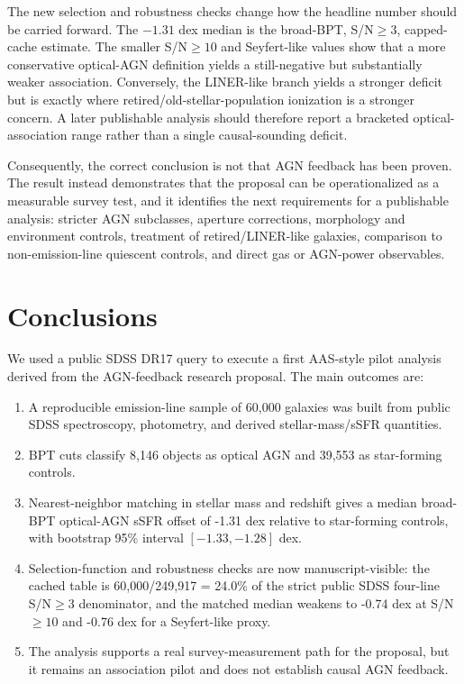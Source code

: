 \documentclass[twocolumn]{aastex631}
\begin{document}
The new selection and robustness checks change how the headline number should be carried forward.  The $-1.31$ dex median is the broad-BPT, S/N$\geq3$, capped-cache estimate.  The smaller S/N$\geq10$ and Seyfert-like values show that a more conservative optical-AGN definition yields a still-negative but substantially weaker association.  Conversely, the LINER-like branch yields a stronger deficit but is exactly where retired/old-stellar-population ionization is a stronger concern.  A later publishable analysis should therefore report a bracketed optical-association range rather than a single causal-sounding deficit.

Consequently, the correct conclusion is not that AGN feedback has been proven.  The result instead demonstrates that the proposal can be operationalized as a measurable survey test, and it identifies the next requirements for a publishable analysis: stricter AGN subclasses, aperture corrections, morphology and environment controls, treatment of retired/LINER-like galaxies, comparison to non-emission-line quiescent controls, and direct gas or AGN-power observables.

\section{Conclusions}\label{sec:conclusions}
We used a public SDSS DR17 query to execute a first AAS-style pilot analysis derived from the AGN-feedback research proposal.  The main outcomes are:
\begin{enumerate}
\item A reproducible emission-line sample of 60,000 galaxies was built from public SDSS spectroscopy, photometry, and derived stellar-mass/sSFR quantities.
\item BPT cuts classify 8,146 objects as optical AGN and 39,553 as star-forming controls.
\item Nearest-neighbor matching in stellar mass and redshift gives a median broad-BPT optical-AGN sSFR offset of -1.31 dex relative to star-forming controls, with bootstrap 95\% interval $[-1.33,-1.28]$ dex.
\item Selection-function and robustness checks are now manuscript-visible: the cached table is 60,000/249,917 = 24.0\% of the strict public SDSS four-line S/N$\geq3$ denominator, and the matched median weakens to -0.74 dex at S/N$\geq10$ and -0.76 dex for a Seyfert-like proxy.
\item The analysis supports a real survey-measurement path for the proposal, but it remains an association pilot and does not establish causal AGN feedback.
\end{enumerate}
\end{document}
